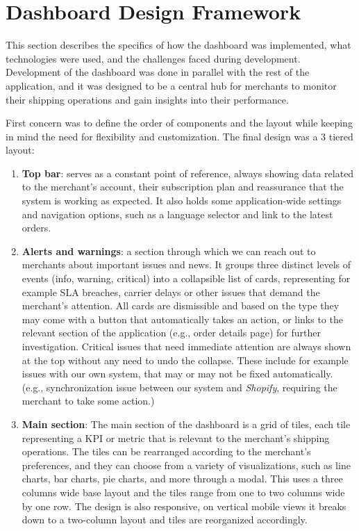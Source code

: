 \documentclass{imc-inf}
\begin{document}
\section{Dashboard Design Framework}
\label{sec:dashboard-design}
This section describes the specifics of how the dashboard was implemented, what technologies were used, and the challenges faced during development.
Development of the dashboard was done in parallel with the rest of the application, and it was designed to be a central hub for merchants to monitor their shipping operations and gain insights into their performance.

First concern was to define the order of components and the layout while keeping in mind the need for flexibility and customization.
The final design was a 3 tiered layout:

\begin{enumerate}
  \item \textbf{Top bar}: serves as a constant point of reference, always showing data related to the merchant's account, their subscription plan and reassurance that the system is working as expected. It also holds some application-wide settings and navigation options, such as a language selector and link to the latest orders.
  \item \textbf{Alerts and warnings}: a section through which we can reach out to merchants about important issues and news. It groups three distinct levels of events (info, warning, critical) into a collapsible list of cards, representing for example SLA breaches, carrier delays or other issues that demand the merchant's attention. All cards are dismissible and based on the type they may come with a button that automatically takes an action, or links to the relevant section of the application (e.g., order details page) for further investigation. Critical issues that need immediate attention are always shown at the top without any need to undo the collapse. These include for example issues with our own system, that may or may not be fixed automatically. (e.g., synchronization issue between our system and \textit{Shopify}, requiring the merchant to take some action.)
  \item \textbf{Main section}: The main section of the dashboard is a grid of tiles, each tile representing a KPI or metric that is relevant to the merchant's shipping operations. The tiles can be rearranged according to the merchant's preferences, and they can choose from a variety of visualizations, such as line charts, bar charts, pie charts, and more through a modal. This uses a three columns wide base layout and the tiles range from one to two columns wide by one row. The design is also responsive, on vertical mobile views it breaks down to a two-column layout and tiles are reorganized accordingly.
\end{enumerate}
\end{document}
